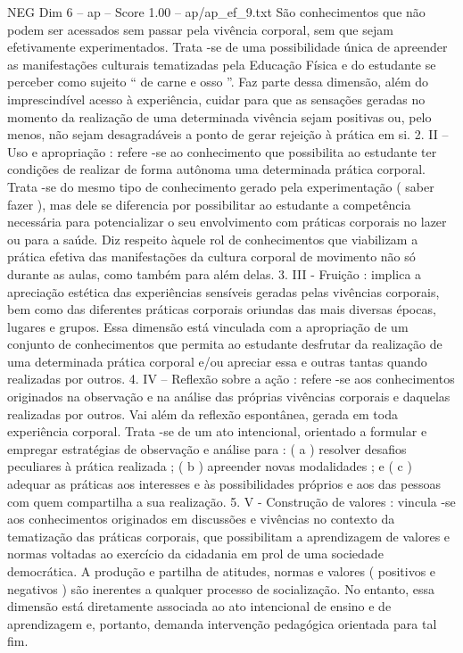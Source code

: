 \begin{textsample}{NEG Dim 6 – ap – Score 1.00 – ap/ap\_ef\_9.txt}
São conhecimentos que não podem ser acessados sem passar pela vivência corporal, sem que sejam efetivamente experimentados.
Trata -se de uma possibilidade única de apreender as manifestações culturais tematizadas pela Educação Física e do estudante se perceber como sujeito “ de carne e osso ”.
Faz parte dessa dimensão, além do imprescindível acesso à experiência, cuidar para que as sensações geradas no momento da realização de uma determinada vivência sejam positivas ou, pelo menos, não sejam desagradáveis a ponto de gerar rejeição à prática em si. 2.
II – Uso e apropriação : refere -se ao conhecimento que possibilita ao estudante ter condições de realizar de forma autônoma uma determinada prática corporal.
Trata -se do mesmo tipo de conhecimento gerado pela experimentação ( saber fazer ), mas dele se diferencia por possibilitar ao estudante a competência necessária para potencializar o seu envolvimento com práticas corporais no lazer ou para a saúde.
Diz respeito àquele rol de conhecimentos que viabilizam a prática efetiva das manifestações da cultura corporal de movimento não só durante as aulas, como também para além delas. 3.
III - Fruição : implica a apreciação estética das experiências sensíveis geradas pelas vivências corporais, bem como das diferentes práticas corporais oriundas das mais diversas épocas, lugares e grupos.
Essa dimensão está vinculada com a apropriação de um conjunto de conhecimentos que permita ao estudante desfrutar da realização de uma determinada prática corporal e/ou apreciar essa e outras tantas quando realizadas por outros. 4.
IV – Reflexão sobre a ação : refere -se aos conhecimentos originados na observação e na análise das próprias vivências corporais e daquelas realizadas por outros.
Vai além da reflexão espontânea, gerada em toda experiência corporal.
Trata -se de um ato intencional, orientado a formular e empregar estratégias de observação e análise para : ( a ) resolver desafios peculiares à prática realizada ; ( b ) apreender novas modalidades ; e ( c ) adequar as práticas aos interesses e às possibilidades próprios e aos das pessoas com quem compartilha a sua realização. 5.
V - Construção de valores : vincula -se aos conhecimentos originados em discussões e vivências no contexto da tematização das práticas corporais, que possibilitam a aprendizagem de valores e normas voltadas ao exercício da cidadania em prol de uma sociedade democrática.
A produção e partilha de atitudes, normas e valores ( positivos e negativos ) são inerentes a qualquer processo de socialização.
No entanto, essa dimensão está diretamente associada ao ato intencional de ensino e de aprendizagem e, portanto, demanda intervenção pedagógica orientada para tal fim.

\end{textsample}
